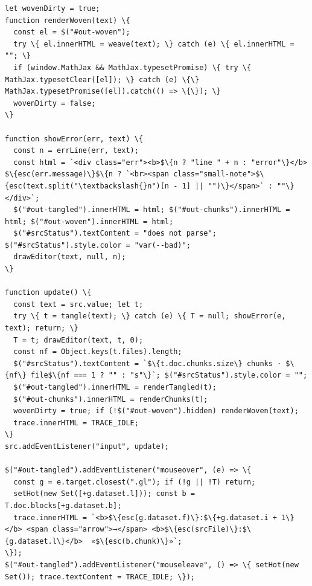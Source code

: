 \documentclass[10pt,a4paper]{article}
\newcounter{chunk}
\begin{document}
\begin{Verbatim}
let wovenDirty = true;
function renderWoven(text) \{
  const el = $("#out-woven");
  try \{ el.innerHTML = weave(text); \} catch (e) \{ el.innerHTML = ""; \}
  if (window.MathJax && MathJax.typesetPromise) \{ try \{ MathJax.typesetClear([el]); \} catch (e) \{\} MathJax.typesetPromise([el]).catch(() => \{\}); \}
  wovenDirty = false;
\}

function showError(err, text) \{
  const n = errLine(err, text);
  const html = `<div class="err"><b>$\{n ? "line " + n : "error"\}</b> $\{esc(err.message)\}$\{n ? `<br><span class="small-note">$\{esc(text.split("\textbackslash{}n")[n - 1] || "")\}</span>` : ""\}</div>`;
  $("#out-tangled").innerHTML = html; $("#out-chunks").innerHTML = html; $("#out-woven").innerHTML = html;
  $("#srcStatus").textContent = "does not parse"; $("#srcStatus").style.color = "var(--bad)";
  drawEditor(text, null, n);
\}

function update() \{
  const text = src.value; let t;
  try \{ t = tangle(text); \} catch (e) \{ T = null; showError(e, text); return; \}
  T = t; drawEditor(text, t, 0);
  const nf = Object.keys(t.files).length;
  $("#srcStatus").textContent = `$\{t.doc.chunks.size\} chunks · $\{nf\} file$\{nf === 1 ? "" : "s"\}`; $("#srcStatus").style.color = "";
  $("#out-tangled").innerHTML = renderTangled(t);
  $("#out-chunks").innerHTML = renderChunks(t);
  wovenDirty = true; if (!$("#out-woven").hidden) renderWoven(text);
  trace.innerHTML = TRACE_IDLE;
\}
src.addEventListener("input", update);

$("#out-tangled").addEventListener("mouseover", (e) => \{
  const g = e.target.closest(".gl"); if (!g || !T) return;
  setHot(new Set([+g.dataset.l])); const b = T.doc.blocks[+g.dataset.b];
  trace.innerHTML = `<b>$\{esc(g.dataset.f)\}:$\{+g.dataset.i + 1\}</b> <span class="arrow">→</span> <b>$\{esc(srcFile)\}:$\{g.dataset.l\}</b>  «$\{esc(b.chunk)\}»`;
\});
$("#out-tangled").addEventListener("mouseleave", () => \{ setHot(new Set()); trace.textContent = TRACE_IDLE; \});
\end{Verbatim}
\end{document}
